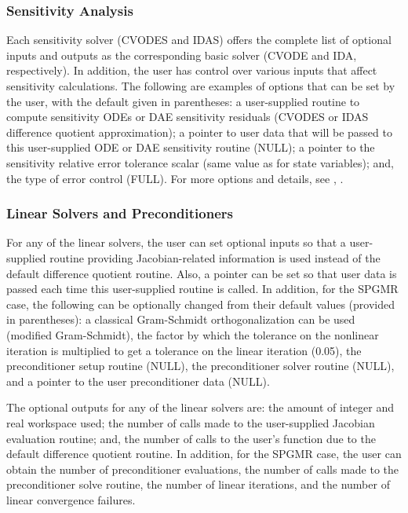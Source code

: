 \subsubsection*{Sensitivity Analysis}

Each sensitivity solver (CVODES and IDAS) offers the complete list of
optional inputs and outputs as the corresponding basic solver (CVODE
and IDA, respectively). In addition, the user has control over various
inputs that affect sensitivity calculations. 
The following are examples of options that can be set by the user,
with the default given in parentheses: a user-supplied routine
to compute sensitivity ODEs or DAE sensitivity residuals (CVODES or
IDAS difference quotient approximation); a pointer to user data that
will be passed to this user-supplied ODE or DAE sensitivity routine (NULL); a
pointer to the sensitivity relative error tolerance scalar (same value as
for state variables); and, the type of error control (FULL).
For more options and details, see \cite{SeHi:03}, \cite{HiSe:02}.

\subsubsection*{Linear Solvers and Preconditioners}

For any of the linear solvers, the user can set optional inputs so 
that a user-supplied routine providing Jacobian-related information
is used instead of the default difference quotient routine. 
Also, a pointer can be set so that user data is passed each time this
user-supplied routine is called. In addition, for the SPGMR case,
the following can be optionally changed from their default values
(provided in parentheses): a classical Gram-Schmidt orthogonalization 
can be used (modified Gram-Schmidt), the factor by which the tolerance on the
nonlinear iteration is multiplied to get a tolerance on the linear
iteration (0.05), the preconditioner setup routine (NULL), the
preconditioner solver routine (NULL), and a pointer to the user
preconditioner data (NULL).

The optional outputs for any of the linear solvers are: the amount of 
integer and real workspace used; the number of calls made to the user-supplied 
Jacobian evaluation routine; and, the number of calls to the user's function 
due to the default difference quotient routine.
In addition, for the SPGMR case, the user can obtain the number of preconditioner
evaluations, the number of calls made to the preconditioner solve
routine, the number of linear iterations, and the number of linear
convergence failures.

